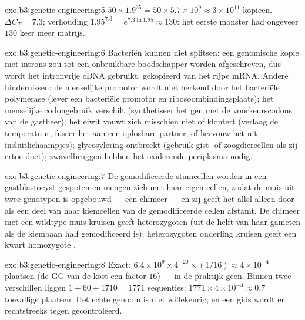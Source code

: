 \begin{solution}{exo:b3:genetic-engineering:5}
$50\times 1.9^{35} = 50\times 5.7\times 10^{9} \approx 3\times 10^{11}$
kopieën. $\Delta C_{T} = 7.3$; verhouding $1.95^{7.3} = e^{7.3\ln 1.95}
\approx 130$: het eerste monster had ongeveer $130$ keer meer matrijs.
\end{solution}

\begin{solution}{exo:b3:genetic-engineering:6}
Bacteriën kunnen niet splitsen: een genomische kopie met introns zou
tot een onbruikbare boodschapper worden afgeschreven, dus wordt het
intronvrije cDNA gebruikt, gekopieerd van het rijpe mRNA. Andere
hindernissen: de menselijke promotor wordt niet herkend door het
bacteriële polymerase (lever een bacteriële promotor en
ribosoombindingsplaats); het menselijke codongebruik verschilt
(synthetiseer het gen met de voorkeurscodons van de gastheer); het
eiwit vouwt zich misschien niet of klontert (verlaag de temperatuur,
fuseer het aan een oplosbare partner, of hervouw het uit
insluitlichaampjes); glycosylering ontbreekt (gebruik gist- of
zoogdiercellen als zij ertoe doet); zwavelbruggen hebben het oxiderende
periplasma nodig.
\end{solution}

\begin{solution}{exo:b3:genetic-engineering:7}
De gemodificeerde stamcellen worden in een gastblastocyst gespoten en
mengen zich met haar eigen cellen, zodat de muis uit twee genotypen is
opgebouwd --- een chimeer --- en zij geeft het allel alleen door als
een deel van haar kiemcellen van de gemodificeerde cellen afstamt. De
chimeer met een wildtype-muis kruisen geeft heterozygoten (uit de helft
van haar gameten als de kiembaan half gemodificeerd is); heterozygoten
onderling kruisen geeft een kwart homozygote .
\end{solution}

\begin{solution}{exo:b3:genetic-engineering:8}
Exact: $6.4\times 10^{9}\times 4^{-20}\times (1/16) \approx 4\times
10^{-4}$ plaatsen (de GG van de  kost een factor $16$) --- in de
praktijk geen. Binnen twee verschillen liggen $1 + 60 + 1710 = 1771$
sequenties: $1771\times 4\times 10^{-4} \approx 0.7$ toevallige
plaatsen. Het echte genoom is niet willekeurig, en een gids wordt er
rechtstreeks tegen gecontroleerd.
\end{solution}

